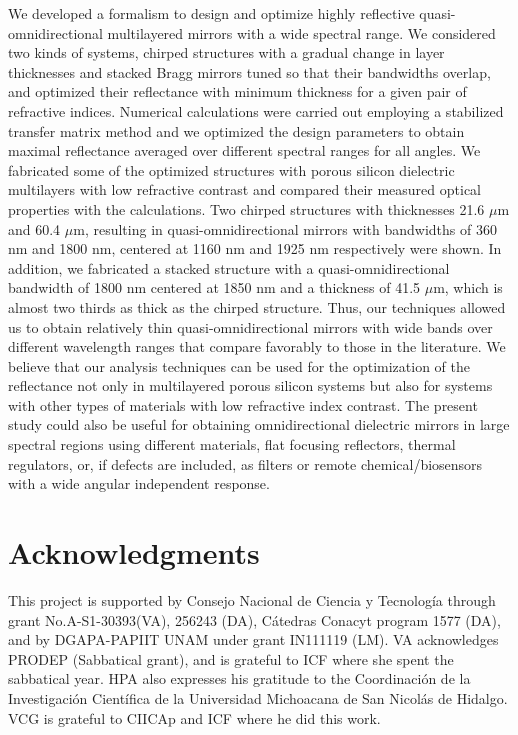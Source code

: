 \documentclass[a4paper,fleqn]{cas-sc}
\begin{document}
We developed a formalism to design and optimize highly
reflective quasi-omnidirectional multilayered mirrors with a wide
spectral range. We considered two kinds of systems, chirped structures with a gradual
change in layer thicknesses and
stacked Bragg mirrors tuned so that their bandwidths overlap, and
optimized their
reflectance with minimum thickness for a given pair of refractive
indices. Numerical calculations were
carried out employing a stabilized transfer matrix method and we optimized the
design parameters to obtain maximal reflectance averaged over different spectral ranges for
all angles.
We fabricated some of the optimized structures with
porous silicon
dielectric multilayers with low refractive contrast and compared their measured  optical properties
with the calculations. Two chirped structures
with thicknesses 21.6 $\mu$m and 60.4 $\mu$m,
resulting in quasi-omnidirectional mirrors with bandwidths of 360 nm and 1800 nm, centered
at 1160 nm and 1925 nm respectively were shown. In addition,
we fabricated a stacked structure  with a
quasi-omnidirectional bandwidth of 1800 nm centered at 1850 nm and a
thickness of 41.5 $\mu$m, which is almost two thirds as thick as the chirped structure.
Thus, our techniques allowed us to obtain relatively thin
quasi-omnidirectional mirrors with wide bands
over different wavelength ranges that compare favorably to those in
the literature.
We believe that our analysis techniques can
be used for the optimization of the reflectance not only in
multilayered porous silicon systems but also for systems with other types of
materials with low refractive index contrast. The present study could
also be useful for obtaining omnidirectional dielectric mirrors in
large spectral regions using different materials,  flat focusing
reflectors, thermal regulators, or, if
defects are included, as filters or remote chemical/biosensors with
a wide angular independent response.


\section*{Acknowledgments}

This project is supported by Consejo Nacional de Ciencia y
Tecnolog\'{i}a through grant No.A-S1-30393(VA), 256243 (DA), C\'{a}tedras
Conacyt program 1577 (DA), and by DGAPA-PAPIIT UNAM under grant IN111119 (LM).
VA acknowledges PRODEP (Sabbatical grant), and
is grateful to ICF where she spent the sabbatical year.
HPA also expresses his gratitude to the Coordinaci\'{o}n
de la Investigaci\'{o}n Cient\'{i}fica de la Universidad
Michoacana de San Nicol\'{a}s de Hidalgo. VCG is grateful to CIICAp
and ICF where he did this work.

\printcredits


\end{document}
